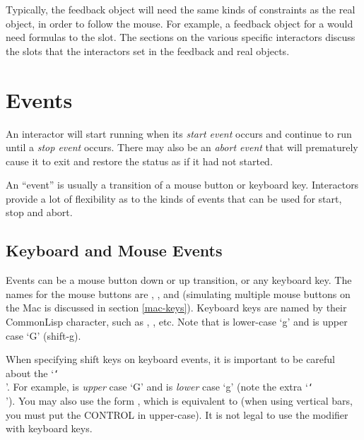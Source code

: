 Typically, the feedback object will need the same kinds of constraints as
the real object, in order to follow the mouse.  For example, a feedback
object for a  would need formulas to the 
slot.  The sections on the various specific interactors discuss the slots
that the interactors set in the feedback and real objects.

\section{Events}
\label{eventspec}

An interactor will start running when its {\it start event} occurs and
continue to run until a {\it stop event} occurs.  There may also be an
{\it abort event} that will prematurely cause it to exit and restore the
status as if it had not started.

An ``event'' is usually a transition of a mouse button or keyboard key.
Interactors provide a lot of flexibility as to the kinds of events that
can be used for start, stop and abort.


\subsection{Keyboard and Mouse Events}
Events can be a mouse button down or up transition, or
any keyboard key.  The names for the mouse buttons are ,
, and  (simulating multiple mouse
buttons on the Mac is discussed in section \ref{mac-keys}).  Keyboard
keys are named by their CommonLisp character, such as ,
, etc.  Note that  is lower-case `g' and  is
upper case `G' (shift-g).

When specifying shift keys on keyboard events, it is important to be
careful about the `{\tt\char`\\}'.  For example,  is {\it upper} case
`G' and  is {\it lower} case `g' (note the extra `{\tt\char`\\}').
You may also use the form , which is equivalent to
 (when using vertical bars, you must put the CONTROL
in upper-case).  It is not legal to use the  modifier with
keyboard keys.

